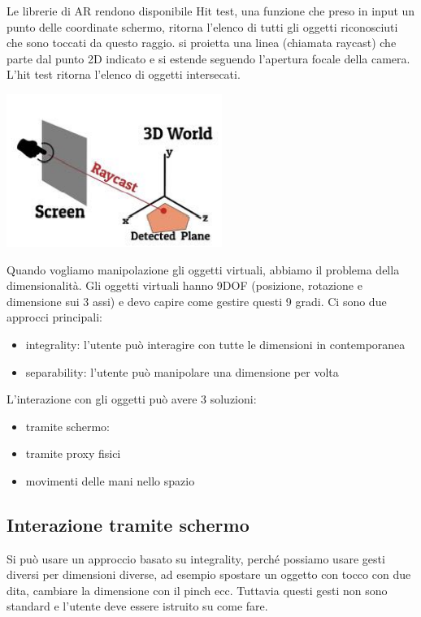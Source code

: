 Le librerie di AR rendono disponibile Hit test, una funzione che preso in input un punto delle coordinate schermo, ritorna l'elenco di tutti gli oggetti riconosciuti che sono toccati da questo raggio. 
si proietta una linea (chiamata raycast) che parte dal punto 2D indicato e si estende seguendo l'apertura focale della camera.
L'hit test ritorna l'elenco di oggetti intersecati.
\begin{center}
    \includegraphics[width=.5\textwidth]{images/MobiDEV/4. augmented reality (display e interaction)/hit test.PNG}
\end{center}
           
Quando vogliamo manipolazione gli oggetti virtuali, abbiamo il problema della dimensionalità. 
Gli oggetti virtuali hanno 9DOF (posizione, rotazione e dimensione sui 3 assi) e devo capire come gestire questi 9 gradi. 
Ci sono due approcci principali:
\begin{itemize}
    \item integrality: l'utente può interagire con tutte le dimensioni in contemporanea
    \item separability: l'utente può manipolare una dimensione per volta
\end{itemize}

L'interazione con gli oggetti può avere 3 soluzioni:
\begin{itemize}
    \item tramite schermo: 
    \item tramite proxy fisici
    \item movimenti delle mani nello spazio
\end{itemize}

\subsection{Interazione tramite schermo}
Si può usare un approccio basato su integrality, perché possiamo usare gesti diversi per dimensioni diverse, ad esempio spostare un oggetto con tocco con due dita, cambiare la dimensione con il pinch ecc. Tuttavia questi gesti non sono standard e l'utente deve essere istruito su come fare.

